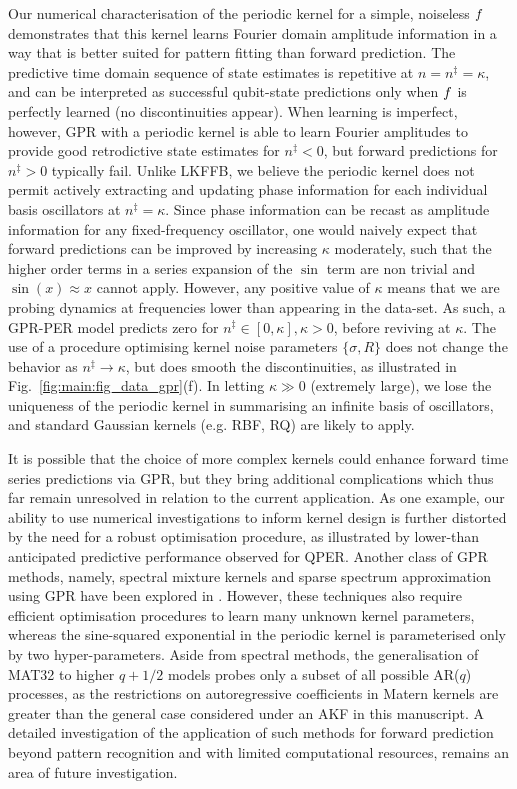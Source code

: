 Our numerical characterisation of the periodic kernel for a simple, noiseless $f$ demonstrates that this kernel learns Fourier domain amplitude information in a way that is better suited for pattern fitting than forward prediction. The predictive time domain sequence of state estimates is repetitive at $ n=n^\ddagger= \kappa$, and can be interpreted as successful qubit-state predictions only when $f$ is perfectly learned (no discontinuities appear). When learning is imperfect, however, GPR with a periodic kernel is able to learn Fourier amplitudes to provide good retrodictive state estimates for $n^\ddagger<0$, but forward predictions for $n^\ddagger>0$ typically fail.  Unlike LKFFB, we believe the periodic kernel does not permit actively extracting and updating phase information for each individual basis oscillators at $n^\ddagger= \kappa$.  Since phase information can be recast as amplitude information for any fixed-frequency oscillator, one would naively expect that forward predictions can be improved by increasing $\kappa$ moderately, such that the higher order terms in a series expansion of the $\sin$ term are non trivial and $\sin(x)\approx x$ cannot apply. However, any positive value of $\kappa$ means that we are probing dynamics at frequencies lower than appearing in the data-set. As such, a GPR-PER model predicts zero for $n^\ddagger \in [0, \kappa], \kappa > 0$, before reviving at $\kappa$.  The use of a procedure optimising kernel noise parameters $\{\sigma, R\}$ does not change the behavior as $ n^\ddagger \to\kappa$, but does smooth the discontinuities, as illustrated in Fig.~\ref{fig:main:fig_data_gpr}(f). In letting $\kappa \gg 0$ (extremely large), we lose the uniqueness of the periodic kernel in summarising an infinite basis of oscillators, and standard Gaussian kernels (e.g. RBF, RQ) are likely to apply. 

It is possible that the choice of more complex kernels could enhance forward time series predictions via GPR, but they bring additional complications which thus far remain unresolved in relation to the current application. As one example, our ability to use numerical investigations to inform kernel design is further distorted by the need for a robust optimisation procedure, as illustrated by lower-than anticipated predictive performance observed for QPER.  Another class of GPR methods, namely, spectral mixture kernels and sparse spectrum approximation using GPR have been explored in \cite{wilson2013, quia2010}. However, these techniques also require efficient optimisation procedures to learn many unknown kernel parameters, whereas the sine-squared exponential in the periodic kernel is parameterised only by two hyper-parameters. Aside from spectral methods, the generalisation of MAT32 to higher $q + 1/2$ models probes only a subset of all possible AR($q$) processes, as the restrictions on autoregressive coefficients in Matern kernels are greater than the general case considered under an AKF in this manuscript. A detailed investigation of the application of such methods for forward prediction beyond pattern recognition and with limited computational resources, remains an area of future investigation.


